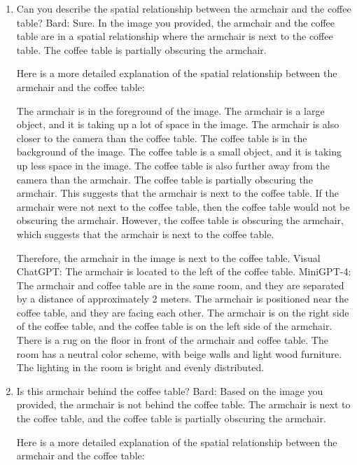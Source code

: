 \begin{enumerate}
    \item Can you describe the spatial relationship between the armchair and the coffee table?
    \subitem Bard: 
    Sure. In the image you provided, the armchair and the coffee table are in a spatial relationship where the armchair is next to the coffee table. The coffee table is partially obscuring the armchair.
    
    Here is a more detailed explanation of the spatial relationship between the armchair and the coffee table:
    
    The armchair is in the foreground of the image. The armchair is a large object, and it is taking up a lot of space in the image. The armchair is also closer to the camera than the coffee table.
    The coffee table is in the background of the image. The coffee table is a small object, and it is taking up less space in the image. The coffee table is also further away from the camera than the armchair.
    The coffee table is partially obscuring the armchair. This suggests that the armchair is next to the coffee table.
    If the armchair were not next to the coffee table, then the coffee table would not be obscuring the armchair. However, the coffee table is obscuring the armchair, which suggests that the armchair is next to the coffee table.
    
    Therefore, the armchair in the image is next to the coffee table.
    \subitem Visual ChatGPT: The armchair is located to the left of the coffee table.
    \subitem MiniGPT-4: The armchair and coffee table are in the same room, and they are separated by a distance of approximately 2 meters. The armchair is positioned near the coffee table, and they are facing each other. The armchair is on the right side of the coffee table, and the coffee table is on the left side of the armchair. There is a rug on the floor in front of the armchair and coffee table. The room has a neutral color scheme, with beige walls and light wood furniture. The lighting in the room is bright and evenly distributed.
    \item Is this armchair behind the coffee table?
    \subitem Bard: Based on the image you provided, the armchair is not behind the coffee table. The armchair is next to the coffee table, and the coffee table is partially obscuring the armchair.

    Here is a more detailed explanation of the spatial relationship between the armchair and the coffee table:
    

\end{enumerate}
